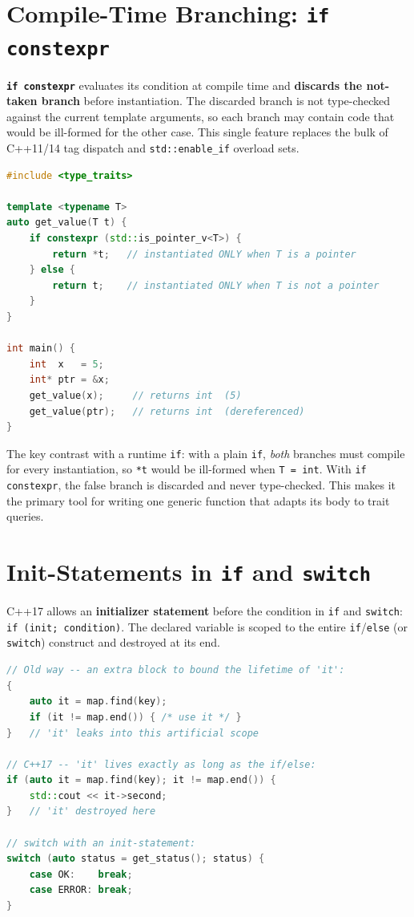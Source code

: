 \section{Compile-Time Branching: \texttt{if constexpr}}
\label{sec:c17-if-constexpr}

\textbf{\texttt{if constexpr}} evaluates its condition at compile time and \textbf{discards the not-taken branch} before instantiation. The discarded branch is not type-checked against the current template arguments, so each branch may contain code that would be ill-formed for the other case. This single feature replaces the bulk of C++11/14 tag dispatch and \texttt{std::enable\_if} overload sets.

\begin{lstlisting}[language=C++,caption={One function body, two compile-time-selected behaviors}]
#include <type_traits>

template <typename T>
auto get_value(T t) {
    if constexpr (std::is_pointer_v<T>) {
        return *t;   // instantiated ONLY when T is a pointer
    } else {
        return t;    // instantiated ONLY when T is not a pointer
    }
}

int main() {
    int  x   = 5;
    int* ptr = &x;
    get_value(x);     // returns int  (5)
    get_value(ptr);   // returns int  (dereferenced)
}
\end{lstlisting}

The key contrast with a runtime \texttt{if}: with a plain \texttt{if}, \emph{both} branches must compile for every instantiation, so \texttt{*t} would be ill-formed when \texttt{T = int}. With \texttt{if constexpr}, the false branch is discarded and never type-checked. This makes it the primary tool for writing one generic function that adapts its body to trait queries.

\section{Init-Statements in \texttt{if} and \texttt{switch}}
\label{sec:c17-init-statements}

C++17 allows an \textbf{initializer statement} before the condition in \texttt{if} and \texttt{switch}: \texttt{if (init; condition)}. The declared variable is scoped to the entire \texttt{if}/\texttt{else} (or \texttt{switch}) construct and destroyed at its end.

\begin{lstlisting}[language=C++,caption={Init-statement scopes the variable to the branch}]
// Old way -- an extra block to bound the lifetime of 'it':
{
    auto it = map.find(key);
    if (it != map.end()) { /* use it */ }
}   // 'it' leaks into this artificial scope

// C++17 -- 'it' lives exactly as long as the if/else:
if (auto it = map.find(key); it != map.end()) {
    std::cout << it->second;
}   // 'it' destroyed here

// switch with an init-statement:
switch (auto status = get_status(); status) {
    case OK:    break;
    case ERROR: break;
}
\end{lstlisting}

